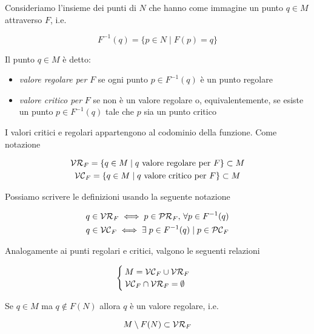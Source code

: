 Consideriamo l'insieme dei punti di $ N $ che hanno come immagine un punto $ q \in M $ attraverso $ F $, i.e.

\begin{equation}
	F^{-1}(q) = \{ p \in N \mid F(p) = q \}
\end{equation}

Il punto $ q \in M $ è detto:

\begin{itemize}
	\item \textit{valore regolare per} $ F $ se ogni punto $ p \in F^{-1}(q) $ è un punto regolare
	
	\item \textit{valore critico per} $ F $ se non è un valore regolare o, equivalentemente, se esiste un punto $ p \in F^{-1}(q) $ tale che $ p $ sia un punto critico
\end{itemize}

I valori critici e regolari appartengono al codominio della funzione. Come notazione

\begin{gather}
	\mathcal{VR}_{F} = \{ q \in M \mid q \text{ valore regolare per } F \} \subset M\\
	\mathcal{VC}_{F} = \{ q \in M \mid q \text{ valore critico per } F \} \subset M
\end{gather}

Possiamo scrivere le definizioni usando la seguente notazione

\begin{gather}
	q \in \mathcal{VR}_{F} \iff p \in \mathcal{PR}_{F}, \, \forall p \in F^{-1}(q)\\
	q \in \mathcal{VC}_{F} \iff \exists \; p \in F^{-1}(q) \mid p \in \mathcal{PC}_{F}
\end{gather}

Analogamente ai punti regolari e critici, valgono le seguenti relazioni

\begin{equation}
	\begin{cases}
		M = \mathcal{VC}_{F} \cup \mathcal{VR}_{F}\\
		\mathcal{VC}_{F} \cap \mathcal{VR}_{F} = \emptyset
	\end{cases}
\end{equation}

\begin{remark}
	Se $ q \in M $ ma $ q \notin F(N) $ allora $ q $ è un valore regolare, i.e.
	
	\begin{equation}
		M \setminus F(N) \subset \mathcal{VR}_{F}
	\end{equation}
\end{remark}

